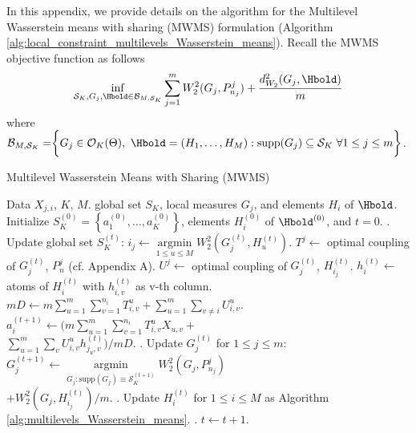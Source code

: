 In this appendix, we provide details on the algorithm for the Multilevel Wasserstein means with sharing (MWMS) 
formulation (Algorithm \ref{alg:local_constraint_multilevels_Wasserstein_means}). Recall the MWMS objective function as follows
\begin{eqnarray}
\mathop {\inf }\limits_{\mathcal{S}_{K},G_{j} , \Hbold \in \mathcal{B}_{M,\mathcal{S}_{K}}}{\mathop {\sum }\limits_{j=1}^{m}{W_{2}^{2}(G_{j},P_{n_{j}}^{j})}+\dfrac{d_{W_{2}}^{2}(G_{j},\Hbold)}{m}} \nonumber
\end{eqnarray}
where  $\mathcal{B}_{M,\mathcal{S}_{K}}=\biggr\{G_{j} \in \mathcal{O}_{K}(\Theta), \ \Hbold=(H_{1},\ldots,H_{M}): 
\text{supp}(G_{j})\subseteq \mathcal{S}_{K}\ \forall 1 \leq j \leq m \biggr\}$. 

\setcounter{algorithm}{1}
\begin{algorithm}[tbp]
   \caption{Multilevel Wasserstein Means with Sharing (MWMS)}
   \label{alg:local_constraint_multilevels_Wasserstein_means}
\begin{algorithmic}
    Data $X_{j,i}$, $K$, $M$.
    global set $S_{K}$, local measures $G_{j}$, and elements $H_{i}$ of $\Hbold$.
   \STATE Initialize $S_{K}^{(0)}=\left\{a_{1}^{(0)},\ldots,a_{K}^{(0)}\right\}$, elements $H_{i}^{(0)}$ of $\Hbold^{(0)}$, and $t = 0$.
   . Update global set $S_{K}^{(t)}$:
   \STATE $i_{j} \leftarrow \mathop {\arg \min}\limits_{1 \leq u \leq M}{W_{2}^{2}(G_{j}^{(t)},H_{u}^{(t)})}$.
   \STATE $T^{j} \leftarrow$ optimal coupling of $G_{j}^{(t)}$, $P_{n}^{j}$ (cf. Appendix A).
   \STATE $U^{j} \leftarrow$ optimal coupling of $G_{j}^{(t)}$, $H_{i_{j}}^{(t)}$.
   \ENDFOR
   \STATE $h_{i}^{(t)} \leftarrow$ atoms of $H_{i}^{(t)}$ with $h_{i,v}^{(t)}$ as v-th column.
   \ENDFOR
   \STATE $m D \leftarrow m \sum \limits_{u=1}^{m}{\sum \limits_{v=1}^{n_{i}}{T_{i,v}^{u}}}+\sum \limits_{u=1}^{m}{\sum \limits_{v \neq i}{U_{i,v}^{u}}}$.
   \STATE $a_{i}^{(t+1)} \leftarrow \biggr(m \sum \limits_{u=1}^{m}{\sum \limits_{v=1}^{n_{i}}{T_{i,v}^{u}X_{u,v}}}+$\\
$\sum \limits_{u=1}^{m}{\sum \limits_{v}{U_{i,v}^{u}h_{j_{u},v}^{(t)}}}\biggr)/mD$.
	\ENDFOR
	. Update $G_{j}^{(t)}$ for $1 \leq j \leq m$:
	\STATE $G_{j}^{(t+1)} \leftarrow \mathop {\arg \min}\limits_{G_{j}: \text{supp}(G_{j}) \equiv \mathcal{S}_{K}^{(t+1)}}{W_{2}^{2}(G_{j},P_{n_{j}}^{j})}$ \\
	$+W_{2}^{2}(G_{j},H_{i_{j}}^{(t)})/m$.
	\ENDFOR
   . Update $H_{i}^{(t)}$ for $1 \leq i \leq M$ as Algorithm \ref{alg:multilevels_Wasserstein_means}.
   . $t \leftarrow t+1$.
   \ENDWHILE
\end{algorithmic}
\end{algorithm}

